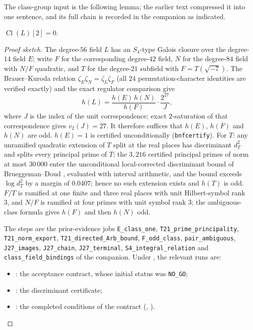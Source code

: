 The class-group input is the following lemma; the earlier text
compressed it into one sentence, and its full chain is recorded in the
companion as indicated.

\begin{lemma}\label{lem:cl2}
$\operatorname{Cl}(L)[2]=0$.
\end{lemma}

\begin{proof}[Proof sketch]
The degree-$56$ field $L$ has an $S_4$-type Galois closure over the
degree-$14$ field $E$; write $F$ for the corresponding degree-$42$
field, $N$ for the degree-$84$ field with $N/F$ quadratic, and $T$ for
the degree-$21$ subfield with $F=T(\sqrt{-7})$.  The Brauer--Kuroda
relation $\zeta_E\zeta_N=\zeta_L\zeta_F$ (all $24$ permutation-character
identities are verified exactly) and the exact regulator comparison
give
\[
 h(L)=\frac{h(E)\,h(N)}{h(F)}\cdot\frac{2^{27}}{J},
\]
where $J$ is the index of the unit correspondence; exact
$2$-saturation of that correspondence gives $v_2(J)=27$.  It therefore
suffices that $h(E)$, $h(F)$ and $h(N)$ are odd.
$h(E)=1$ is certified unconditionally (\texttt{bnfcertify}).
For $T$: any unramified quadratic extension of $T$ split at the real
places has discriminant $d_T^2$ and splits every principal prime of $T$;
the $3{,}216$ certified principal primes of norm at most $30\,000$ enter
the unconditional local-corrected discriminant bound of
Brueggeman--Doud \cite[Theorem~2.4(1)]{BrueggemanDoud}, evaluated with
interval arithmetic, and the bound exceeds $\log d_T^2$ by a margin of
$0.0407$; hence no such extension exists and $h(T)$ is odd.
$F/T$ is ramified at one finite and three real places with unit
Hilbert-symbol rank $3$, and $N/F$ is ramified at four primes with unit
symbol rank $3$; the ambiguous-class formula gives $h(F)$ and then
$h(N)$ odd.
\begingroup\raggedright
The steps are the prior-evidence jobs
\texttt{E\_class\_one}, \texttt{T21\_prime\_principality},
\texttt{T21\_norm\_export}, \texttt{T21\_directed\_Arb\_bound},
\texttt{F\_odd\_class}, \texttt{pair\_ambiguous},
\texttt{J27\_images}, \texttt{J27\_chain}, \texttt{J27\_terminal},
\texttt{S4\_integral\_relation} and \texttt{class\_field\_bindings} of
the companion.  Under , the
relevant runs are:
\begin{itemize}\small
\item {}: the acceptance
contract, whose initial status was \texttt{NO\_GO};
\item {}: the
discriminant certificate;
\item {}:
the completed conditions of the contract
(,
).
\end{itemize}
\endgroup
\end{proof}
